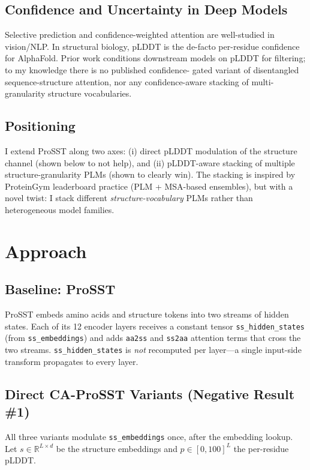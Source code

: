 \documentclass[11pt,a4paper]{article}
\begin{document}
\subsection{Confidence and Uncertainty in Deep Models}
Selective prediction and confidence-weighted attention are well-studied
in vision/NLP. In structural biology, pLDDT is the de-facto per-residue
confidence for AlphaFold. Prior work conditions downstream models on
pLDDT for filtering; to my knowledge there is no published confidence-
gated variant of disentangled sequence-structure attention, nor any
confidence-aware stacking of multi-granularity structure vocabularies.

\subsection{Positioning}
I extend ProSST along two axes: (i) direct pLDDT modulation of the
structure channel (shown below to not help), and (ii) pLDDT-aware
stacking of multiple structure-granularity PLMs (shown to clearly win).
The stacking is inspired by ProteinGym leaderboard practice
(PLM + MSA-based ensembles), but with a novel twist: I stack
different \emph{structure-vocabulary} PLMs rather than heterogeneous
model families.

\section{Approach}

\subsection{Baseline: ProSST}
ProSST embeds amino acids and structure tokens into two streams of
hidden states. Each of its 12 encoder layers receives a constant tensor
\texttt{ss\_hidden\_states} (from \texttt{ss\_embeddings}) and adds
\texttt{aa2ss} and \texttt{ss2aa} attention terms that cross the two
streams. \texttt{ss\_hidden\_states} is \emph{not} recomputed per
layer---a single input-side transform propagates to every layer.

\subsection{Direct CA-ProSST Variants (Negative Result \#1)}
All three variants modulate \texttt{ss\_embeddings} once, after the
embedding lookup. Let $s \in \mathbb{R}^{L \times d}$ be the structure
embeddings and $p \in [0,100]^{L}$ the per-residue pLDDT.
\end{document}
